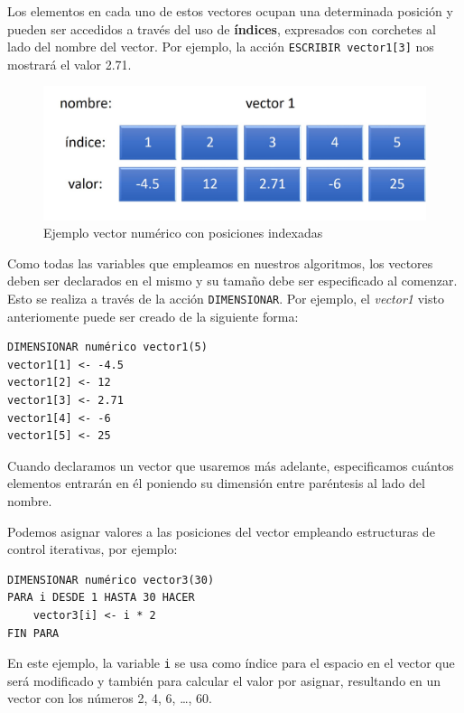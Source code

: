 \documentclass[]{book}
\begin{document}
Los elementos en cada uno de estos vectores ocupan una determinada
posición y pueden ser accedidos a través del uso de \textbf{índices},
expresados con corchetes al lado del nombre del vector. Por ejemplo, la
acción \texttt{ESCRIBIR\ vector1{[}3{]}} nos mostrará el valor 2.71.

\begin{figure}

{\centering \includegraphics[width=0.8\linewidth]{images/12_vector1} 

}

\caption{Ejemplo vector numérico con posiciones indexadas}\label{fig:vector1bis}
\end{figure}

Como todas las variables que empleamos en nuestros algoritmos, los
vectores deben ser declarados en el mismo y su tamaño debe ser
especificado al comenzar. Esto se realiza a través de la acción
\texttt{DIMENSIONAR}. Por ejemplo, el \emph{vector1} visto anteriomente
puede ser creado de la siguiente forma:

\begin{verbatim}
DIMENSIONAR numérico vector1(5)
vector1[1] <- -4.5
vector1[2] <- 12
vector1[3] <- 2.71
vector1[4] <- -6
vector1[5] <- 25
\end{verbatim}

Cuando declaramos un vector que usaremos más adelante, especificamos
cuántos elementos entrarán en él poniendo su dimensión entre paréntesis
al lado del nombre.

Podemos asignar valores a las posiciones del vector empleando
estructuras de control iterativas, por ejemplo:

\begin{verbatim}
DIMENSIONAR numérico vector3(30)
PARA i DESDE 1 HASTA 30 HACER
    vector3[i] <- i * 2
FIN PARA
\end{verbatim}

En este ejemplo, la variable \texttt{i} se usa como índice para el
espacio en el vector que será modificado y también para calcular el
valor por asignar, resultando en un vector con los números 2, 4, 6,
\ldots{}, 60.
\end{document}
